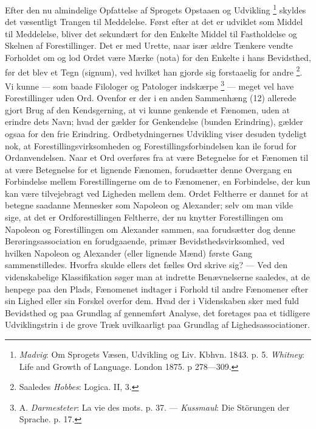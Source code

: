 \documentclass[12pt,a4paper,openany]{book}
\newcommand{\opage}[1]{\marginnote{\footnotesize\textit{[#1]}}}
\begin{document}
Efter den nu almindelige Opfattelse af Sprogets Opstaaen og Udvikling%
\footnote[2]{\emph{Madvig}: Om Sprogets Væsen, Udvikling og Liv. Kbhvn. 1843.
p. 5. \emph{Whitney}: Life and Growth of Language. London 1875. p 278---309.}
skyldes det væsentligt Trangen til Meddelelse. Først efter at det er udviklet
som Middel til Meddelelse, bliver det sekundært for den Enkelte Middel til
Fastholdelse og Skelnen af Forestillinger. Det er med Urette, naar især ældre
Tænkere vendte Forholdet om og lod Ordet være Mærke (nota) for den Enkelte i
hans Bevidsthed, før det blev et Tegn (signum), ved hvilket han gjorde sig
forstaaelig for andre%
\footnote[3]{Saaledes \emph{Hobbes}: Logica. II, 3.}. Vi kunne --- som baade
Filologer og Patologer indskærpe%
\footnote[4]{A. \emph{Darmesteter}: La vie des mots. p. 37. ---
\emph{Kussmaul}: Die Störungen der Sprache. p. 17.} --- meget vel have
Forestillinger uden Ord. Ovenfor er der i en anden Sammenhæng (12) allerede
gjort Brug af den Kendsgerning, at vi kunne genkende et Fænomen, uden at
erindre dets Navn; hvad der gælder for Genkendelse (bunden Erindring), gælder
ogsaa for den frie Erindring. Ordbetydningernes Udvikling viser desuden
tydeligt nok, at Forestillingsvirksomheden og Forestillingsforbindelsen kan ile
forud for Ordanvendelsen. Naar et Ord overføres fra at være Betegnelse for et
Fænomen til at være Betegnelse for et lignende Fænomen, forudsætter denne
Overgang en Forbindelse mellem Forestillingerne om de to Fænomener, en
Forbindelse, der kun kan være tilvejebragt ved Ligheden mellem dem. Ordet
Feltherre er dannet for at betegne saadanne Mennesker som Napoleon og
Alexander; selv om man vilde sige, at det er Ordforestillingen Feltherre, der
nu knytter Forestillingen om Napoleon og Forestillingen om Alexander sammen,
saa forudsætter dog denne Berøringsassociation en forudgaaende, primær
Bevidsthedsvirksomhed, ved hvilken Napoleon og Alexander (eller lignende Mænd)
første Gang sammenstilledes.
\setcounter{footnote}{0}%
\opage{51}Hvorfra skulde ellers det fælles Ord skrive sig? --- Ved den
videnskabelige Klassifikation søger man at indrette Benævnelserne saaledes, at
de henpege paa den Plads, Fænomenet indtager i Forhold til andre Fænomener
efter sin Lighed eller sin Forskel overfor dem. Hvad der i Videnskaben sker med
fuld Bevidsthed og paa Grundlag af gennemført Analyse, det foretages paa et
tidligere Udviklingstrin i de grove Træk uvilkaarligt paa Grundlag af
Lighedsassociationer.
\end{document}
